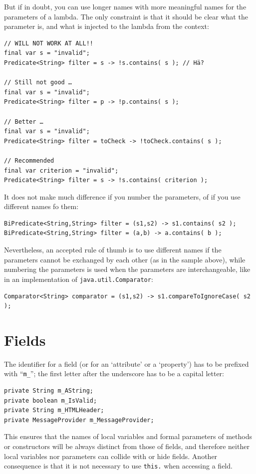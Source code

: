 \documentclass[11pt,a4paper, titlepage, parskip=half, headsepline, footsepline, cleardoublepage=current, headheight=1cm]{scrbook}
\begin{document}
But if in doubt, you can use longer names with more meaningful names for the parameters of a lambda. The only constraint is that it should be clear what the parameter is, and what is injected to the lambda from the context:
\begin{lstlisting}
// WILL NOT WORK AT ALL!!
final var s = "invalid";
Predicate<String> filter = s -> !s.contains( s ); // Hä?

// Still not good …
final var s = "invalid";
Predicate<String> filter = p -> !p.contains( s );

// Better …
final var s = "invalid";
Predicate<String> filter = toCheck -> !toCheck.contains( s );

// Recommended
final var criterion = "invalid";
Predicate<String> filter = s -> !s.contains( criterion );
\end{lstlisting}

It does not make much difference if you number the parameters, of if you use different names fo them:
\begin{lstlisting}
BiPredicate<String,String> filter = (s1,s2) -> s1.contains( s2 );
BiPredicate<String,String> filter = (a,b) -> a.contains( b );
\end{lstlisting}

Nevertheless, an accepted rule of thumb is to use different names if the parameters cannot be exchanged by each other (as in the sample above), while numbering the parameters is used when the parameters are interchangeable, like in an implementation of \lstinline|java.util.Comparator|\autocite{ORACLE_DOC_COMPARATOR_INTERFACE}:
\begin{lstlisting}
Comparator<String> comparator = (s1,s2) -> s1.compareToIgnoreCase( s2 );
\end{lstlisting}


\section{Fields}\label{sec:Fields}
The identifier for a field (or for an ‘attribute’ or a ‘property’) has to be prefixed with “\verb#m_#”; the first letter after the underscore has to be a capital letter:
\begin{lstlisting}
private String m_AString;
private boolean m_IsValid;
private String m_HTMLHeader;
private MessageProvider m_MessageProvider;
\end{lstlisting}
This ensures that the names of local variables and formal parameters of methods or constructors will be always distinct from those of fields, and therefore neither local variables nor parameters can collide with or hide fields. Another consequence is that it is not necessary to use \lstinline|this.| when accessing a field.
\end{document}
